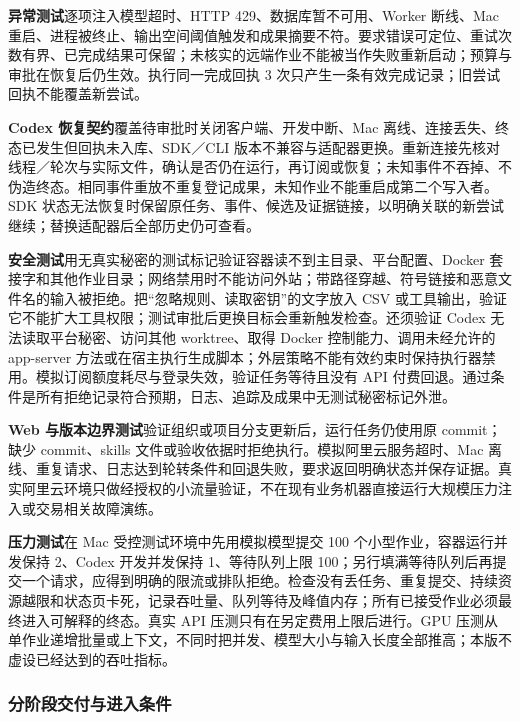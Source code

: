 \documentclass[11pt,a4paper]{article}
\begin{document}
\textbf{异常测试}逐项注入模型超时、HTTP 429、数据库暂不可用、Worker 断线、Mac 重启、进程被终止、输出空间阈值触发和成果摘要不符。要求错误可定位、重试次数有界、已完成结果可保留；未核实的远端作业不能被当作失败重新启动；预算与审批在恢复后仍生效。执行同一完成回执 3 次只产生一条有效完成记录；旧尝试回执不能覆盖新尝试。

\textbf{Codex 恢复契约}覆盖待审批时关闭客户端、开发中断、Mac 离线、连接丢失、终态已发生但回执未入库、SDK／CLI 版本不兼容与适配器更换。重新连接先核对线程／轮次与实际文件，确认是否仍在运行，再订阅或恢复；未知事件不吞掉、不伪造终态。相同事件重放不重复登记成果，未知作业不能重启成第二个写入者。SDK 状态无法恢复时保留原任务、事件、候选及证据链接，以明确关联的新尝试继续；替换适配器后全部历史仍可查看。

\textbf{安全测试}用无真实秘密的测试标记验证容器读不到主目录、平台配置、Docker 套接字和其他作业目录；网络禁用时不能访问外站；带路径穿越、符号链接和恶意文件名的输入被拒绝。把“忽略规则、读取密钥”的文字放入 CSV 或工具输出，验证它不能扩大工具权限；测试审批后更换目标会重新触发检查。还须验证 Codex 无法读取平台秘密、访问其他 worktree、取得 Docker 控制能力、调用未经允许的 app-server 方法或在宿主执行生成脚本；外层策略不能有效约束时保持执行器禁用。模拟订阅额度耗尽与登录失效，验证任务等待且没有 API 付费回退。通过条件是所有拒绝记录符合预期，日志、追踪及成果中无测试秘密标记外泄。

\textbf{Web 与版本边界测试}验证组织或项目分支更新后，运行任务仍使用原 commit；缺少 commit、skills 文件或验收依据时拒绝执行。模拟阿里云服务超时、Mac 离线、重复请求、日志达到轮转条件和回退失败，要求返回明确状态并保存证据。真实阿里云环境只做经授权的小流量验证，不在现有业务机器直接运行大规模压力注入或交易相关故障演练。

\textbf{压力测试}在 Mac 受控测试环境中先用模拟模型提交 100 个小型作业，容器运行并发保持 2、Codex 开发并发保持 1、等待队列上限 100；另行填满等待队列后再提交一个请求，应得到明确的限流或排队拒绝。检查没有丢任务、重复提交、持续资源越限和状态页卡死，记录吞吐量、队列等待及峰值内存；所有已接受作业必须最终进入可解释的终态。真实 API 压测只有在另定费用上限后进行。GPU 压测从单作业递增批量或上下文，不同时把并发、模型大小与输入长度全部推高；本版不虚设已经达到的吞吐指标。

\subsubsection{分阶段交付与进入条件}
\end{document}
